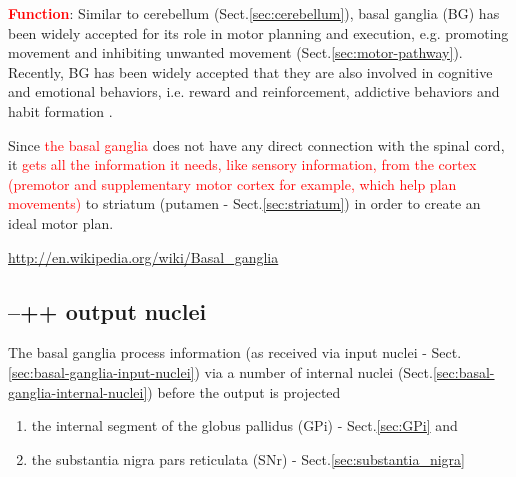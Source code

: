 \textcolor{red}{\bf Function}:
Similar to cerebellum (Sect.\ref{sec:cerebellum}), basal ganglia (BG) has been
widely accepted for its role in motor planning and execution, e.g. promoting
movement and inhibiting unwanted movement (Sect.\ref{sec:motor-pathway}). Recently, BG has been widely accepted that they are also involved in
cognitive and emotional behaviors, i.e. reward and reinforcement, addictive
behaviors and habit formation \citep{middleton2000}.


Since \textcolor{red}{the basal ganglia} does not have any direct connection
with the spinal cord, it \textcolor{red}{gets all the information it needs, like
sensory information, from the cortex  (premotor and supplementary motor cortex
for example, which help plan movements)} to striatum (putamen -
Sect.\ref{sec:striatum}) in order to create an ideal motor plan.



 

 
\url{http://en.wikipedia.org/wiki/Basal_ganglia} 

\subsection{--++ output nuclei}
\label{sec:basal-ganglia-output-nuclei}

The basal ganglia process information (as received via input nuclei -
Sect.\ref{sec:basal-ganglia-input-nuclei}) via a number of internal nuclei
(Sect.\ref{sec:basal-ganglia-internal-nuclei}) before the output is
projected 

\begin{enumerate}
  \item the internal segment of the globus pallidus (GPi) -
  Sect.\ref{sec:GPi} and
  
  \item the substantia  nigra pars reticulata (SNr) -
  Sect.\ref{sec:substantia_nigra} 
\end{enumerate}

